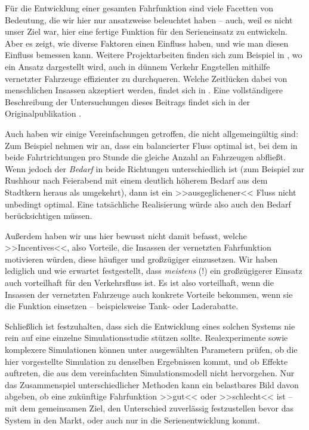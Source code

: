 Für die Entwicklung einer gesamten Fahrfunktion sind viele Facetten von Bedeutung, die wir hier nur ansatzweise beleuchtet haben -- auch, weil es nicht unser Ziel war, hier eine fertige Funktion für den Serieneinsatz zu entwickeln. Aber es zeigt, wie diverse Faktoren einen Einfluss haben, und wie man diesen Einfluss bemessen kann. Weitere Projektarbeiten finden sich zum Beispiel in \cite{naumann2017cooperativePlanning}, wo ein Ansatz dargestellt wird, auch in dünnem Verkehr Engstellen mithilfe vernetzter Fahrzeuge effizienter zu durchqueren. Welche Zeitlücken dabei von menschlichen Insassen akzeptiert werden, findet sich in \cite{ehrhardt2021gap}. Eine vollständigere Beschreibung der Untersuchungen dieses Beitrags findet sich in der Originalpublikation \cite{ziehn2023cooperative}.

Auch haben wir einige Vereinfachungen getroffen, die nicht allgemeingültig sind: Zum Beispiel nehmen wir an, dass ein balancierter Fluss optimal ist, bei dem in beide Fahrtrichtungen pro Stunde die gleiche Anzahl an Fahrzeugen abfließt. Wenn jedoch der \emph{Bedarf} in beide Richtungen unterschiedlich ist (zum Beispiel zur Rushhour nach Feierabend mit einem deutlich höherem Bedarf aus dem Stadtkern heraus als umgekehrt), dann ist ein >>ausgeglichener<< Fluss nicht unbedingt optimal. Eine tatsächliche Realisierung würde also auch den Bedarf berücksichtigen müssen.

Außerdem haben wir uns hier bewusst nicht damit befasst, welche >>Incentives<<, also Vorteile, die Insassen der vernetzten Fahrfunktion motivieren würden, diese häufiger und großzügiger einzusetzen. Wir haben lediglich und wie erwartet festgestellt, dass \emph{meistens} (!) ein großzügigerer Einsatz auch vorteilhaft für den Verkehrsfluss ist. Es ist also vorteilhaft, wenn die Insassen der vernetzten Fahrzeuge auch konkrete Vorteile bekommen, wenn sie die Funktion einsetzen -- beispielsweise Tank- oder Laderabatte.

Schließlich ist festzuhalten, dass sich die Entwicklung eines solchen Systems nie rein auf eine einzelne Simulationsstudie stützen sollte. Realexperimente sowie komplexere Simulationen können unter ausgewählten Parametern prüfen, ob die hier vorgestellte Simulation zu denselben Ergebnissen kommt, und ob Effekte auftreten, die aus dem vereinfachten Simulationsmodell nicht hervorgehen. Nur das Zusammenspiel unterschiedlicher Methoden kann ein belastbares Bild davon abgeben, ob eine zukünftige Fahrfunktion >>gut<< oder >>schlecht<< ist -- mit dem gemeinsamen Ziel, den Unterschied zuverlässig festzustellen bevor das System in den Markt, oder auch nur in die Serienentwicklung kommt. \markEndOfContent





\nocite{ziehn2023cooperative}

\printbibliography[heading=subbibliography]